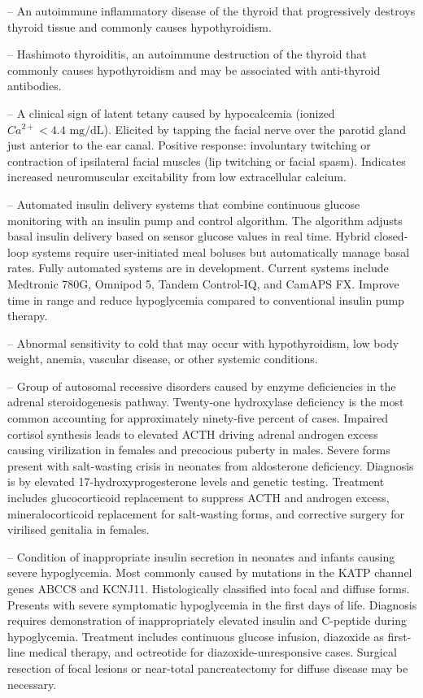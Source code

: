 -- An autoimmune inflammatory disease of the thyroid that progressively destroys thyroid tissue and commonly causes hypothyroidism.

-- Hashimoto thyroiditis, an autoimmune destruction of the thyroid that commonly causes hypothyroidism and may be associated with anti-thyroid antibodies.

-- A clinical sign of latent tetany caused by hypocalcemia (ionized $Ca^{2+} <4.4\text{ mg/dL}$). Elicited by tapping the facial nerve over the parotid gland just anterior to the ear canal. Positive response: involuntary twitching or contraction of ipsilateral facial muscles (lip twitching or facial spasm). Indicates increased neuromuscular excitability from low extracellular calcium.

-- Automated insulin delivery systems that combine continuous glucose monitoring with an insulin pump and control algorithm. The algorithm adjusts basal insulin delivery based on sensor glucose values in real time. Hybrid closed-loop systems require user-initiated meal boluses but automatically manage basal rates. Fully automated systems are in development. Current systems include Medtronic 780G, Omnipod 5, Tandem Control-IQ, and CamAPS FX. Improve time in range and reduce hypoglycemia compared to conventional insulin pump therapy.

-- Abnormal sensitivity to cold that may occur with hypothyroidism, low body weight, anemia, vascular disease, or other systemic conditions.

-- Group of autosomal recessive disorders caused by enzyme deficiencies in the adrenal steroidogenesis pathway. Twenty-one hydroxylase deficiency is the most common accounting for approximately ninety-five percent of cases. Impaired cortisol synthesis leads to elevated ACTH driving adrenal androgen excess causing virilization in females and precocious puberty in males. Severe forms present with salt-wasting crisis in neonates from aldosterone deficiency. Diagnosis is by elevated 17-hydroxyprogesterone levels and genetic testing. Treatment includes glucocorticoid replacement to suppress ACTH and androgen excess, mineralocorticoid replacement for salt-wasting forms, and corrective surgery for virilised genitalia in females.

-- Condition of inappropriate insulin secretion in neonates and infants causing severe hypoglycemia. Most commonly caused by mutations in the KATP channel genes ABCC8 and KCNJ11. Histologically classified into focal and diffuse forms. Presents with severe symptomatic hypoglycemia in the first days of life. Diagnosis requires demonstration of inappropriately elevated insulin and C-peptide during hypoglycemia. Treatment includes continuous glucose infusion, diazoxide as first-line medical therapy, and octreotide for diazoxide-unresponsive cases. Surgical resection of focal lesions or near-total pancreatectomy for diffuse disease may be necessary.

